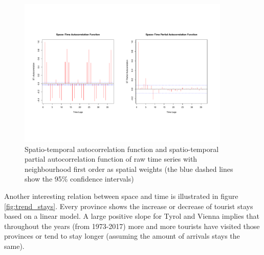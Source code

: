 \documentclass[a4paper,reqno,]{article}
\begin{document}
\\
\\
\begin{figure}[h!]
\begin{minipage}[b]{1\textwidth}
\centering
    \includegraphics[width=0.9\textwidth]{images/EA/STACF_STPACF.pdf}
    \caption{ Spatio-temporal autocorrelation function and spatio-temporal partial autocorrelation function of raw time series with neighbourhood first order as spatial weights (the blue dashed lines show the 95\% confidence intervals) }\label{fig:ST(P)ACFplot}
\end{minipage}
\end{figure} 
\newpage
\noindent
Another interesting relation between space and time is illustrated in figure \ref{fig:trend_stays}. Every province shows the increase or decrease of tourist stays based on a linear model. A large positive slope for Tyrol and Vienna implies that throughout the years (from 1973-2017) more and more tourists have visited those provinces or tend to stay longer (assuming the amount of arrivals stays the same). %
\end{document}
